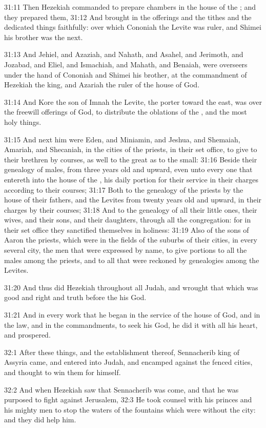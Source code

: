 31:11 Then Hezekiah commanded to prepare chambers in the house of the
\LORD; and they prepared them, 31:12 And brought in the offerings and
the tithes and the dedicated things faithfully: over which Cononiah
the Levite was ruler, and Shimei his brother was the next.

31:13 And Jehiel, and Azaziah, and Nahath, and Asahel, and Jerimoth,
and Jozabad, and Eliel, and Ismachiah, and Mahath, and Benaiah, were
overseers under the hand of Cononiah and Shimei his brother, at the
commandment of Hezekiah the king, and Azariah the ruler of the house
of God.

31:14 And Kore the son of Imnah the Levite, the porter toward the
east, was over the freewill offerings of God, to distribute the
oblations of the \LORD, and the most holy things.

31:15 And next him were Eden, and Miniamin, and Jeshua, and Shemaiah,
Amariah, and Shecaniah, in the cities of the priests, in their set
office, to give to their brethren by courses, as well to the great as
to the small: 31:16 Beside their genealogy of males, from three years
old and upward, even unto every one that entereth into the house of
the \LORD, his daily portion for their service in their charges
according to their courses; 31:17 Both to the genealogy of the priests
by the house of their fathers, and the Levites from twenty years old
and upward, in their charges by their courses; 31:18 And to the
genealogy of all their little ones, their wives, and their sons, and
their daughters, through all the congregation: for in their set office
they sanctified themselves in holiness: 31:19 Also of the sons of
Aaron the priests, which were in the fields of the suburbs of their
cities, in every several city, the men that were expressed by name, to
give portions to all the males among the priests, and to all that were
reckoned by genealogies among the Levites.

31:20 And thus did Hezekiah throughout all Judah, and wrought that
which was good and right and truth before the \LORD his God.

31:21 And in every work that he began in the service of the house of
God, and in the law, and in the commandments, to seek his God, he did
it with all his heart, and prospered.

32:1 After these things, and the establishment thereof, Sennacherib
king of Assyria came, and entered into Judah, and encamped against the
fenced cities, and thought to win them for himself.

32:2 And when Hezekiah saw that Sennacherib was come, and that he was
purposed to fight against Jerusalem, 32:3 He took counsel with his
princes and his mighty men to stop the waters of the fountains which
were without the city: and they did help him.

